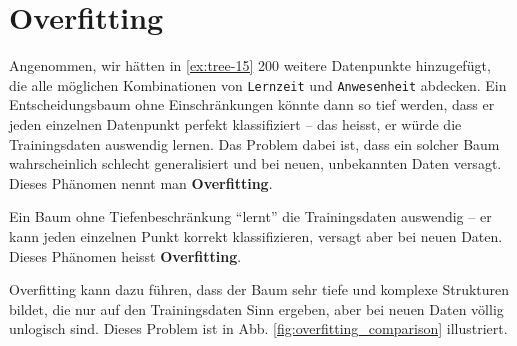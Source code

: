 \section{Overfitting}
Angenommen, wir hätten in \cref{ex:tree-15} 200 weitere Datenpunkte hinzugefügt, die alle möglichen Kombinationen von \texttt{Lernzeit} und \texttt{Anwesenheit} abdecken. Ein Entscheidungsbaum ohne Einschränkungen könnte dann so tief werden, dass er jeden einzelnen Datenpunkt perfekt klassifiziert -- das heisst, er würde die Trainingsdaten auswendig lernen. Das Problem dabei ist, dass ein solcher Baum wahrscheinlich schlecht generalisiert und bei neuen, unbekannten Daten versagt. Dieses Phänomen nennt man \textbf{Overfitting}.

\begin{myattention}[Overfitting]
    Ein Baum ohne Tiefenbeschränkung \enquote{lernt} die Trainingsdaten auswendig --
    er kann jeden einzelnen Punkt korrekt klassifizieren, versagt aber bei neuen Daten.
    Dieses Phänomen heisst \textbf{Overfitting}.

    Overfitting kann dazu führen, dass der Baum sehr tiefe und komplexe Strukturen bildet, die nur auf den Trainingsdaten Sinn ergeben, aber bei neuen Daten völlig unlogisch sind. Dieses Problem ist in Abb. \cref{fig:overfitting_comparison} illustriert.


\end{myattention}
